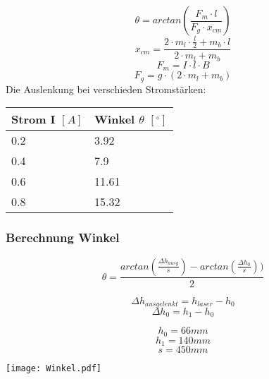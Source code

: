 \documentclass{article}
\begin{document}
\begin{equation}
\theta = arctan(\frac{F_m \cdot l}{F_g \cdot x_{cm}})
\end{equation}
\begin{equation}
x_{cm} = \frac{2 \cdot m_l\cdot \frac{l}{2} + m_b \cdot l}{2 \cdot m_l+ m_b}
\end{equation}
\begin{equation}
F_m=I \cdot l \cdot B
\end{equation}
\begin{equation}
F_g = g \cdot (2 \cdot m_l + m_b)
\end{equation}
Die Auslenkung bei verschieden Stromstärken:
\begin{table}[H]
	\centering
	\begin{tabular}{|l|l|}
		
		\hline
		Strom I $[A]$ & Winkel $\theta$ $[^\circ ]$ \\ \hline
		0.2           & 3.92                   \\ 
		0.4           & 7.9                    \\ 
		0.6           & 11.61                  \\ 
		0.8           & 15.32                  \\
		\hline
	\end{tabular}
\end{table}
\subsubsection{Berechnung Winkel}
	\begin{minipage}[t]{.5\textwidth}
\begin{equation}
\theta= \frac{arctan(\frac{\Delta h_{ausg}}{s})-arctan(\frac{\Delta h_0}{s}))}{2}
\end{equation}

\begin{equation}
\Delta h_{ausgelenkt}=h_{laser}-h_0
\end{equation}
\begin{equation}
\Delta h_0 = h_1-h_0
\end{equation}

\begin{equation}
h_0 = 66mm
\end{equation}
\begin{equation}
h_1 = 140mm
\end{equation}
\begin{equation}
s = 450mm
\end{equation}

	\end{minipage}
	\begin{minipage}[t]{.5\textwidth}%
	\vspace{-\ht\strutbox}\texttt{[image: Winkel.pdf]} 
\end{minipage}\\
\end{document}
